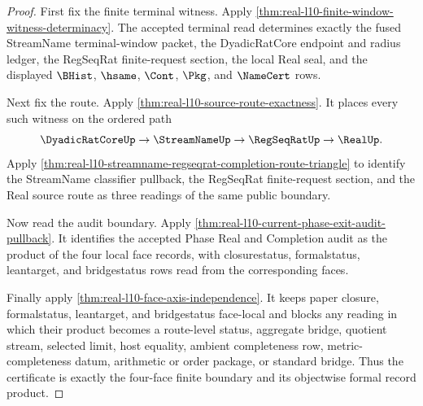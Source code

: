 \begin{proof}
First fix the finite terminal witness. Apply
\autoref{thm:real-l10-finite-window-witness-determinacy}. The accepted
terminal read determines exactly the fused StreamName terminal-window packet,
the DyadicRatCore endpoint and radius ledger, the RegSeqRat finite-request
section, the local Real seal, and the displayed $\BHist$, $\hsame$, $\Cont$,
$\Pkg$, and $\NameCert$ rows.

Next fix the route. Apply \autoref{thm:real-l10-source-route-exactness}. It
places every such witness on the ordered path
$$
\DyadicRatCoreUp \to \StreamNameUp \to \RegSeqRatUp \to \RealUp.
$$
Apply \autoref{thm:real-l10-streamname-regseqrat-completion-route-triangle} to
identify the StreamName classifier pullback, the RegSeqRat finite-request
section, and the Real source route as three readings of the same public
boundary.

Now read the audit boundary. Apply
\autoref{thm:real-l10-current-phase-exit-audit-pullback}. It identifies the
accepted Phase Real and Completion audit as the product of the four local face
records, with closurestatus, formalstatus, leantarget, and bridgestatus rows
read from the corresponding faces.

Finally apply \autoref{thm:real-l10-face-axis-independence}. It keeps paper
closure, formalstatus, leantarget, and bridgestatus face-local and blocks any
reading in which their product becomes a route-level status, aggregate bridge,
quotient stream, selected limit, host equality, ambient completeness row,
metric-completeness datum, arithmetic or order package, or standard bridge.
Thus the certificate is exactly the four-face finite boundary and its
objectwise formal record product.
\end{proof}

